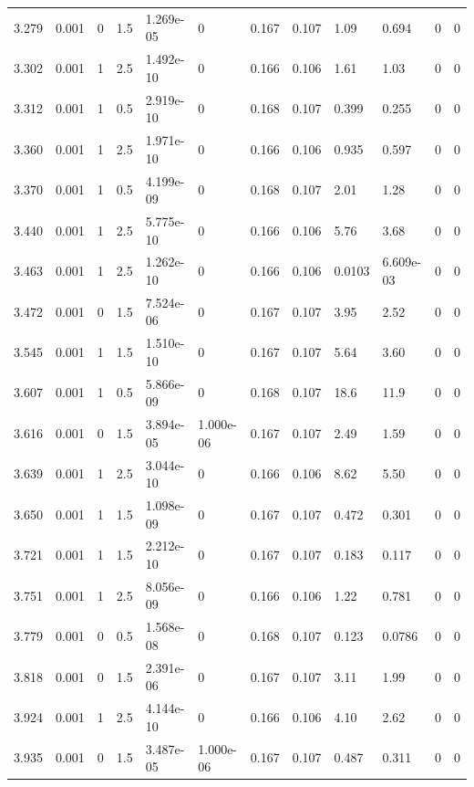 \documentclass[preview]{standalone}
\begin{document}
{{{\begin{tabular}{L{1.2cm}C{1.2cm} C{0.3cm}C{0.5cm} C{1.4cm}C{1.4cm} C{1.4cm}C{1.4cm} C{1.6cm}C{1.6cm} C{1.6cm}C{1.6cm}}
  3.279  &  0.001  & 0     & 1.5 &  1.269e-05  & 0  &  0.167&   0.107& 1.09 & 0.694   &  0 & 0  \\ 
  3.302  &  0.001  & 1     & 2.5 &  1.492e-10  & 0  &  0.166&   0.106& 1.61 & 1.03   &  0 & 0  \\ 
  3.312  &  0.001  & 1     & 0.5 &  2.919e-10  & 0  &  0.168&   0.107& 0.399 & 0.255   &  0 & 0  \\ 
  3.360  &  0.001  & 1     & 2.5 &  1.971e-10  & 0  &  0.166&   0.106& 0.935 & 0.597   &  0 & 0  \\ 
  3.370  &  0.001  & 1     & 0.5 &  4.199e-09  & 0  &  0.168&   0.107& 2.01 & 1.28   &  0 & 0  \\ 
  3.440  &  0.001  & 1     & 2.5 &  5.775e-10  & 0  &  0.166&   0.106& 5.76 & 3.68   &  0 & 0  \\ 
  3.463  &  0.001  & 1     & 2.5 &  1.262e-10  & 0  &  0.166&   0.106& 0.0103 & 6.609e-03   &  0 & 0  \\ 
  3.472  &  0.001  & 0     & 1.5 &  7.524e-06  & 0  &  0.167&   0.107& 3.95 & 2.52   &  0 & 0  \\ 
  3.545  &  0.001  & 1     & 1.5 &  1.510e-10  & 0  &  0.167&   0.107& 5.64 & 3.60   &  0 & 0  \\ 
  3.607  &  0.001  & 1     & 0.5 &  5.866e-09  & 0  &  0.168&   0.107& 18.6 & 11.9   &  0 & 0  \\ 
  3.616  &  0.001  & 0     & 1.5 &  3.894e-05  & 1.000e-06  &  0.167&   0.107& 2.49 & 1.59   &  0 & 0  \\ 
  3.639  &  0.001  & 1     & 2.5 &  3.044e-10  & 0  &  0.166&   0.106& 8.62 & 5.50   &  0 & 0  \\ 
  3.650  &  0.001  & 1     & 1.5 &  1.098e-09  & 0  &  0.167&   0.107& 0.472 & 0.301   &  0 & 0  \\ 
  3.721  &  0.001  & 1     & 1.5 &  2.212e-10  & 0  &  0.167&   0.107& 0.183 & 0.117   &  0 & 0  \\ 
  3.751  &  0.001  & 1     & 2.5 &  8.056e-09  & 0  &  0.166&   0.106& 1.22 & 0.781   &  0 & 0  \\ 
  3.779  &  0.001  & 0     & 0.5 &  1.568e-08  & 0  &  0.168&   0.107& 0.123 & 0.0786   &  0 & 0  \\ 
  3.818  &  0.001  & 0     & 1.5 &  2.391e-06  & 0  &  0.167&   0.107& 3.11 & 1.99   &  0 & 0  \\ 
  3.924  &  0.001  & 1     & 2.5 &  4.144e-10  & 0  &  0.166&   0.106& 4.10 & 2.62   &  0 & 0  \\ 
  3.935  &  0.001  & 0     & 1.5 &  3.487e-05  & 1.000e-06  &  0.167&   0.107& 0.487 & 0.311   &  0 & 0  \\ 

\end{tabular}}}}
\end{document}
